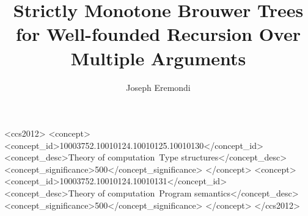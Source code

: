 \documentclass[dvipsnames,sigplan,10pt]{acmart}\settopmatter{printfolios=false,printccs=false,printacmref=false}
\begin{document}
\title{Strictly Monotone Brouwer Trees for Well-founded Recursion Over Multiple Arguments}


  \author{Joseph Eremondi}





\renewcommand{\shortauthors}{Joseph Eremondi}




\begin{abstract}
  
\end{abstract}

\begin{CCSXML}
<ccs2012>
<concept>
<concept_id>10003752.10010124.10010125.10010130</concept_id>
<concept_desc>Theory of computation~Type structures</concept_desc>
<concept_significance>500</concept_significance>
</concept>
<concept>
<concept_id>10003752.10010124.10010131</concept_id>
<concept_desc>Theory of computation~Program semantics</concept_desc>
<concept_significance>500</concept_significance>
</concept>
</ccs2012>
\end{CCSXML}
\end{document}
